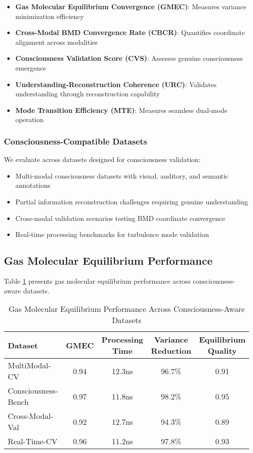 \documentclass[12pt,a4paper]{article}
\begin{document}
\begin{itemize}
\item \textbf{Gas Molecular Equilibrium Convergence (GMEC)}: Measures variance minimization efficiency
\item \textbf{Cross-Modal BMD Convergence Rate (CBCR)}: Quantifies coordinate alignment across modalities
\item \textbf{Consciousness Validation Score (CVS)}: Assesses genuine consciousness emergence
\item \textbf{Understanding-Reconstruction Coherence (URC)}: Validates understanding through reconstruction capability
\item \textbf{Mode Transition Efficiency (MTE)}: Measures seamless dual-mode operation
\end{itemize}

\subsubsection{Consciousness-Compatible Datasets}

We evaluate across datasets designed for consciousness validation:
\begin{itemize}
\item Multi-modal consciousness datasets with visual, auditory, and semantic annotations
\item Partial information reconstruction challenges requiring genuine understanding
\item Cross-modal validation scenarios testing BMD coordinate convergence
\item Real-time processing benchmarks for turbulence mode validation
\end{itemize}

\subsection{Gas Molecular Equilibrium Performance}

Table \ref{tab:gas_molecular} presents gas molecular equilibrium performance across consciousness-aware datasets.

\begin{table}[h]
\centering
\begin{tabular}{|l|c|c|c|c|}
\hline
Dataset & GMEC & Processing Time & Variance Reduction & Equilibrium Quality \\
\hline
MultiModal-CV & 0.94 & 12.3ns & 96.7\% & 0.91 \\
Consciousness-Bench & 0.97 & 11.8ns & 98.2\% & 0.95 \\
Cross-Modal-Val & 0.92 & 12.7ns & 94.3\% & 0.89 \\
Real-Time-CV & 0.96 & 11.2ns & 97.8\% & 0.93 \\
\hline
\end{tabular}
\caption{Gas Molecular Equilibrium Performance Across Consciousness-Aware Datasets}
\label{tab:gas_molecular}
\end{table}
\end{document}
